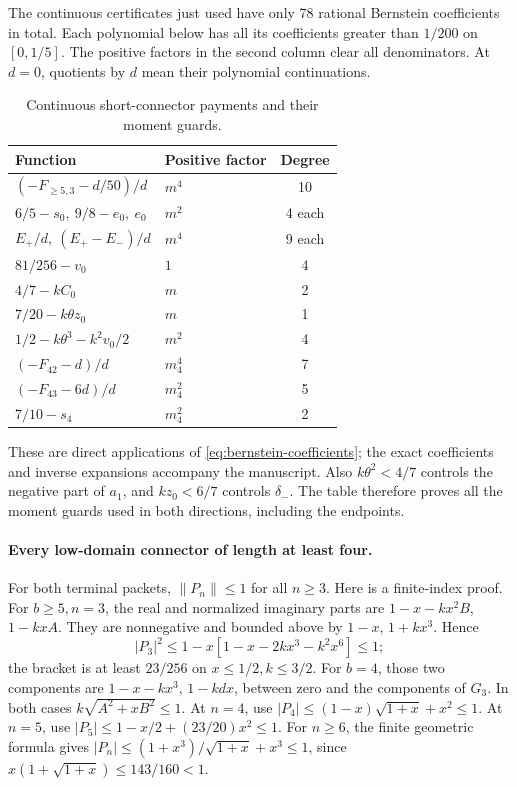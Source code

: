 The continuous certificates just used have only 78 rational
Bernstein coefficients in total. Each polynomial below has all its
coefficients greater than \(1/200\) on \([0,1/5]\).
The positive factors in the second column clear all denominators.
At \(d=0\), quotients by \(d\) mean their polynomial continuations.
\begin{table}[htbp]\centering\small
\caption{Continuous short-connector payments and their moment guards.}
\label{tab:unit-ordinary:three-low-certificates}
\begin{tabular}{@{}llc@{}}\toprule
Function & Positive factor & Degree\\\midrule
\((-F_{\ge5,3}-d/50)/d\) & \(m^4\) & 10\\
\(6/5-s_0,\ 9/8-e_0,\ e_0\) & \(m^2\) & 4 each\\
\(E_+/d,\ (E_+-E_-)/d\) & \(m^4\) & 9 each\\
\(81/256-v_0\) & \(1\) & 4\\
\(4/7-kC_0\) & \(m\) & 2\\
\(7/20-k\theta z_0\) & \(m\) & 1\\
\(1/2-k\theta^3-k^2v_0/2\) & \(m^2\) & 4\\
\((-F_{42}-d)/d\) & \(m_4^4\) & 7\\
\((-F_{43}-6d)/d\) & \(m_4^2\) & 5\\
\(7/10-s_4\) & \(m_4^2\) & 2\\\bottomrule
\end{tabular}
\end{table}
These are direct applications of \eqref{eq:bernstein-coefficients};
the exact coefficients and inverse expansions accompany the manuscript.
Also \(k\theta^2<4/7\) controls the negative part of \(a_1\),
and \(kz_0<6/7\) controls \(\delta_-\). The table therefore proves
all the moment guards used in both directions, including the endpoints.

\paragraph{Every low-domain connector of length at least four.}
For both terminal packets, \(\|P_n\|\le1\) for all \(n\ge3\).
Here is a finite-index proof. For \(b\ge5,n=3\), the real and
normalized imaginary parts are \(1-x-kx^2B\), \(1-kxA\).
They are nonnegative and bounded above by \(1-x\), \(1+kx^3\).
Hence
\[
 |P_3|^2\le1-x[1-x-2kx^3-k^2x^6]\le1;
\]
the bracket is at least \(23/256\) on \(x\le1/2,k\le3/2\).
For \(b=4\), those two components are
\(1-x-kx^3\), \(1-kdx\), between zero and the components of
\(G_3\). In both cases \(k\sqrt{A^2+xB^2}\le1\).
At \(n=4\), use
\(|P_4|\le(1-x)\sqrt{1+x}+x^2\le1\).
At \(n=5\), use
\(|P_5|\le1-x/2+(23/20)x^2\le1\).
For \(n\ge6\), the finite geometric formula gives
\(|P_n|\le(1+x^3)/\sqrt{1+x}+x^3\le1\), since
\(x(1+\sqrt{1+x})\le143/160<1\).


